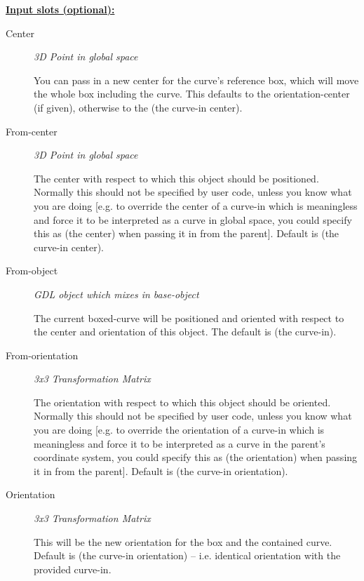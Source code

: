 \documentclass [11pt]{book}
\begin{document}
\begin{itemize}
\textbf{
\underline{Input slots (optional):}}

\begin{description}

\item [Center]
\emph{3D Point in global space}

 You can pass in a new center for the curve's reference box,
which will move the whole box including the curve. This defaults to the
orientation-center (if given), otherwise to the (the curve-in center).




\item [From-center]
\emph{3D Point in global space}

 The center with respect to which this object should be positioned. Normally
this should not be specified by user code, unless you know what you are doing [e.g. to override the center
of a curve-in which is meaningless and force it to be interpreted as a curve in global space, you could
specify this as (the center) when passing it in from the parent].
Default is (the curve-in center).




\item [From-object]
\emph{GDL object which mixes in base-object}

 The current boxed-curve will be positioned and oriented with respect
to the center and orientation of this object. The default is (the curve-in).




\item [From-orientation]
\emph{3x3 Transformation Matrix}

 The orientation with respect to which this object should be oriented. Normally
this should not be specified by user code, unless you know what you are doing [e.g. to override the orientation
of a curve-in which is meaningless and force it to be interpreted as a curve in the parent's coordinate system,
you could specify this as (the orientation) when passing it in from the parent].
Default is (the curve-in orientation).




\item [Orientation]
\emph{3x3 Transformation Matrix}

 This will be the new orientation for the box and the contained curve. Default is
(the curve-in orientation) -- i.e. identical orientation with the provided curve-in.





\end{description}
\end{itemize}
\end{document}
